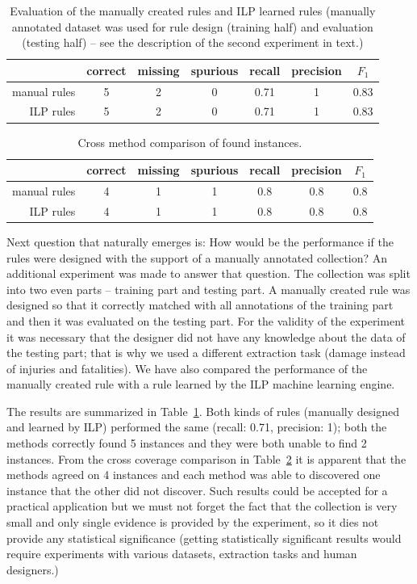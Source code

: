 \begin{table}
	\centering
	\begin{tabular}{|r|c|c|c|c|c|c|}
		\hline
		 & correct & missing & spurious & recall & precision & $F_1$\\
		\hline
		manual rules & 5 & 2 & 0 & 0.71 & 1 & 0.83\\
		\hline
		ILP rules & 5 & 2 & 0 & 0.71 & 1 & 0.83\\
		\hline
	\end{tabular}
	\caption{Evaluation of the manually created rules and ILP learned rules (manually annotated dataset was used for rule design (training half) and evaluation (testing half) -- see the description of the second experiment in text.)}
	\label{tab:manual_damage_manual_eval}
\end{table}

\begin{table}
	\centering
	\begin{tabular}{|r|c|c|c|c|c|c|}
		\hline
		 & correct & missing & spurious & recall & precision & $F_1$\\
		\hline
		manual rules & 4 & 1 & 1 & 0.8 & 0.8 & 0.8\\
		\hline
		ILP rules & 4 & 1 & 1 & 0.8 & 0.8 & 0.8\\
		\hline
	\end{tabular}
	\caption{Cross method comparison of found instances.}
	\label{tab:manual_damage_cross_method}
\end{table}




Next question that naturally emerges is: How would be the performance if the rules were designed with the support of a manually annotated collection? An additional experiment was made to answer that question. The collection was split into two even parts -- training part and testing part. A manually created rule was designed so that it correctly matched with all annotations of the training part and then it was evaluated on the testing part. For the validity of the experiment it was necessary that the designer did not have any knowledge about the data of the testing part; that is why we used a different extraction task (damage instead of injuries and fatalities). We have also compared the performance of the manually created rule with a rule learned by the ILP machine learning engine.

The results are summarized in Table~\ref{tab:manual_damage_manual_eval}. Both kinds of rules (manually designed and learned by ILP) performed the same (recall: 0.71, precision: 1); both the methods correctly found 5 instances and they were both unable to find 2 instances. From the cross coverage comparison in 
Table~\ref{tab:manual_damage_cross_method} it is apparent that the methods agreed on 4 instances and each method was able to discovered one instance that the other did not discover. Such results could be accepted for a practical application but we must not forget the fact that the collection is very small and only single evidence is provided by the experiment, so it dies not provide any statistical significance (getting statistically significant results would require experiments with various datasets, extraction tasks and human designers.) 

